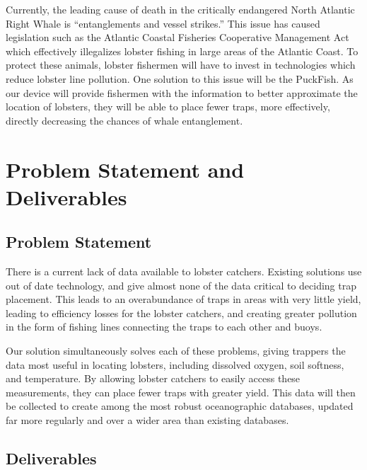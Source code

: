 \documentclass[12pt]{article}         %
\begin{document}
\par Currently, the leading cause of death in the critically endangered North Atlantic Right Whale is “entanglements and vessel strikes.” \cite{noaa:2021} \cite{noaa:2021_2} This issue has caused legislation such as the Atlantic Coastal Fisheries Cooperative Management Act which effectively illegalizes lobster fishing in large areas of the Atlantic Coast. \cite{congress:1981} \cite{congress:1981_2} To protect these animals, lobster fishermen will have to invest in technologies which reduce lobster line pollution. One solution to this issue will be the PuckFish. As our device will provide fishermen with the information to better approximate the location of lobsters, they will be able to place fewer traps, more effectively, directly decreasing the chances of whale entanglement. 

\section{Problem Statement and Deliverables}

\subsection{Problem Statement}

\par There is a current lack of data available to lobster catchers. Existing solutions use out of date technology, and give almost none of the data critical to deciding trap placement. This leads to an overabundance of traps in areas with very little yield, leading to efficiency losses for the lobster catchers, and creating greater pollution in the form of fishing lines connecting the traps to each other and buoys. 
\par Our solution simultaneously solves each of these problems, giving trappers the data most useful in locating lobsters, including dissolved oxygen, soil softness, and temperature. By allowing lobster catchers to easily access these measurements, they can place fewer traps with greater yield. This data will then be collected to create among the most robust oceanographic databases, updated far more regularly and over a wider area than existing databases. 

\subsection{Deliverables}
\end{document}
